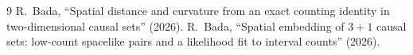 \documentclass[11pt,a4paper]{article}
\begin{document}
\begin{thebibliography}{9}\small
{} R.~Bada, ``Spatial distance and curvature from an exact counting identity in two-dimensional causal sets'' (2026).
 R.~Bada, ``Spatial embedding of $3+1$ causal sets: low-count spacelike pairs and a likelihood fit to interval counts'' (2026).
\end{thebibliography}
\end{document}
